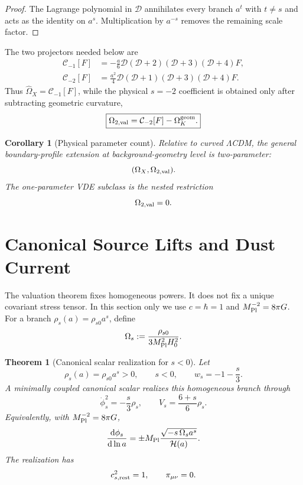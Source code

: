 \documentclass[aps,prd,reprint,onecolumn,nofootinbib,superscriptaddress,showkeys]{revtex4-2}
\numberwithin{equation}{section}
\theoremstyle{definition}
\theoremstyle{plain}
\newtheorem{theorem}{Theorem}[section]
\newtheorem{corollary}{Corollary}[section]
\newcommand{\dd}{\mathrm d}
\newcommand{\Dil}{\mathscr D}
\begin{document}
\begin{proof}
The Lagrange polynomial in \(\Dil\) annihilates every branch \(a^t\) with \(t\ne s\) and acts as the identity on \(a^s\).  Multiplication by \(a^{-s}\) removes the remaining scale factor.
\end{proof}

The two projectors needed below are
\begin{align}
\mathcal C_{-1}[F]
&=-\frac a6\Dil(\Dil+2)(\Dil+3)(\Dil+4)F,\\
\mathcal C_{-2}[F]
&=\frac{a^2}{4}\Dil(\Dil+1)(\Dil+3)(\Dil+4)F.
\end{align}
Thus \(\widehat\Omega_X=\mathcal C_{-1}[F]\), while the physical \(s=-2\) coefficient is obtained only after subtracting geometric curvature,
\begin{equation}
\boxed{
\Omega_{2,\rm val}=\mathcal C_{-2}[F]-\Omega_K^{\rm geom}.
}
\end{equation}

\begin{corollary}[Physical parameter count]
Relative to curved \(\Lambda\)CDM, the general boundary-profile extension at background-geometry level is two-parameter:
\begin{equation}
(\Omega_X,\Omega_{2,\rm val}).
\end{equation}
The one-parameter VDE subclass is the nested restriction
\begin{equation}
\Omega_{2,\rm val}=0.
\end{equation}
\end{corollary}

\section{Canonical Source Lifts and Dust Current}

The valuation theorem fixes homogeneous powers.  It does not fix a unique covariant stress tensor.  In this section only we use \(c=\hbar=1\) and \(M_{\rm Pl}^{-2}=8\pi G\).  For a branch \(\rho_s(a)=\rho_{s0}a^s\), define
\begin{equation}
\Omega_s:=\frac{\rho_{s0}}{3M_{\rm Pl}^2H_0^2}.
\end{equation}

\begin{theorem}[Canonical scalar realization for \(s<0\)]
Let
\begin{equation}
\rho_s(a)=\rho_{s0}a^s>0,
\qquad
s<0,
\qquad
w_s=-1-\frac s3.
\end{equation}
A minimally coupled canonical scalar realizes this homogeneous branch through
\begin{equation}
\dot\phi_s^2=-\frac{s}{3}\rho_s,
\qquad
V_s=\frac{6+s}{6}\rho_s.
\end{equation}
Equivalently, with \(M_{\rm Pl}^{-2}=8\pi G\),
\begin{equation}
\frac{\dd\phi_s}{\dd\ln a}
=
\pm M_{\rm Pl}
\frac{\sqrt{-s\,\Omega_s a^s}}{\mathcal H(a)}.
\end{equation}
The realization has
\begin{equation}
c_{s,\rm rest}^2=1,
\qquad
\pi_{\mu\nu}=0.
\end{equation}
\end{theorem}
\end{document}
